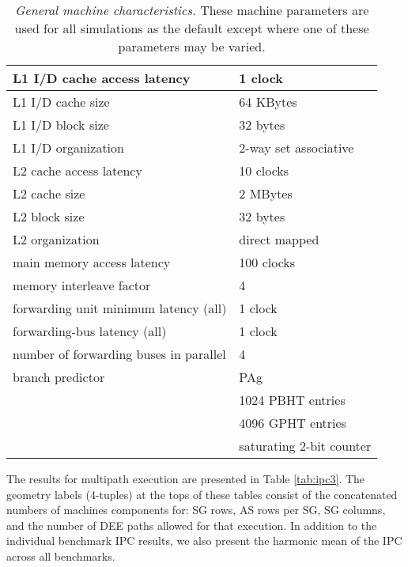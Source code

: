 \documentclass[10pt,twocolumn,dvips]{article}
\begin{document}
\begin{table*}
\scriptsize{
\begin{center}
\caption{{\em General machine characteristics.}
These machine parameters are used for all simulations as
the default except where one of these parameters may be varied.}
\label{tab:params}
\begin{tabular}{|l|l|}
\hline 
L1 I/D cache access latency&1 clock\\
\hline
L1 I/D cache size&64 KBytes\\
\hline
L1 I/D block size&32 bytes\\
\hline
L1 I/D organization&2-way set associative\\
\hline
L2 cache access latency&10 clocks\\
\hline
L2 cache size&2 MBytes\\
\hline
L2 block size&32 bytes\\
\hline
L2 organization&direct mapped\\
\hline
main memory access latency&100 clocks\\
\hline
memory interleave factor&4\\
\hline
forwarding unit minimum latency (all)&1 clock\\
\hline
forwarding-bus latency (all)&1 clock\\
\hline
number of forwarding buses in parallel&4\\
\hline
branch predictor&PAg\\
\cline{2-2}
 & 1024 PBHT entries\\
\cline{2-2}
 & 4096 GPHT entries\\
\cline{2-2}
 & saturating 2-bit counter\\
\hline
\end{tabular}
\end{center}
}
\end{table*}
%
The results for multipath execution are
presented in Table \ref{tab:ipc3}.
The geometry labels (4-tuples) 
at the tops of these tables consist of the concatenated 
numbers of
machines components for: SG rows, AS rows per SG, SG columns,
and the number of DEE paths allowed for that execution.
In addition to the individual benchmark IPC results, we also
present the harmonic mean of the IPC across all benchmarks.
%
%
\end{document}
